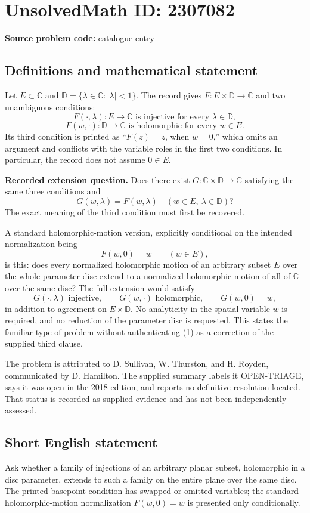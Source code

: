 \documentclass[11pt]{article}
\newcommand{\C}{\mathbb{C}}
\begin{document}
\section*{UnsolvedMath ID: 2307082}
\textbf{Source problem code:} catalogue entry
\subsection{Definitions and mathematical statement}
Let $E\subset\C$ and $\mathbb D=\{\lambda\in\C:|\lambda|<1\}$. The record gives $F:E\times\mathbb D\to\C$ and two unambiguous conditions:
\[
 F(\cdot,\lambda):E\to\C\text{ is injective for every }\lambda\in\mathbb D,
\]
\[
 F(w,\cdot):\mathbb D\to\C\text{ is holomorphic for every }w\in E.
\]
Its third condition is printed as ``$F(z)=z$, when $w=0$,'' which omits an argument and conflicts with the variable roles in the first two conditions. In particular, the record does not assume $0\in E$.

\textbf{Recorded extension question.} Does there exist $G:\C\times\mathbb D\to\C$ satisfying the same three conditions and
\[
 G(w,\lambda)=F(w,\lambda)\quad(w\in E,\ \lambda\in\mathbb D)?
\]
The exact meaning of the third condition must first be recovered.

A standard holomorphic-motion version, explicitly conditional on the intended normalization being
\[
 F(w,0)=w\qquad(w\in E), \tag{1}
\]
is this: does every normalized holomorphic motion of an arbitrary subset $E$ over the whole parameter disc extend to a normalized holomorphic motion of all of $\C$ over the same disc? The full extension would satisfy
\[
 G(\cdot,\lambda)\text{ injective},\qquad
 G(w,\cdot)\text{ holomorphic},\qquad G(w,0)=w,
\]
in addition to agreement on $E\times\mathbb D$. No analyticity in the spatial variable $w$ is required, and no reduction of the parameter disc is requested. This states the familiar type of problem without authenticating (1) as a correction of the supplied third clause.

The problem is attributed to D. Sullivan, W. Thurston, and H. Royden, communicated by D. Hamilton. The supplied summary labels it OPEN-TRIAGE, says it was open in the 2018 edition, and reports no definitive resolution located. That status is recorded as supplied evidence and has not been independently assessed.
\subsection{Short English statement}
Ask whether a family of injections of an arbitrary planar subset, holomorphic in a disc parameter, extends to such a family on the entire plane over the same disc. The printed basepoint condition has swapped or omitted variables; the standard holomorphic-motion normalization $F(w,0)=w$ is presented only conditionally.
\end{document}
